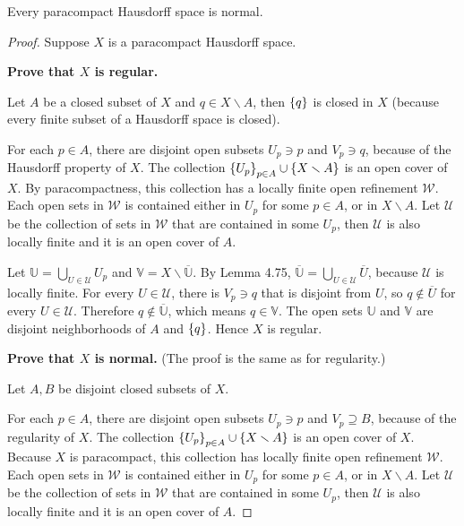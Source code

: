 \begin{theorem}{4.81}
	Every paracompact Hausdorff space is normal.
\end{theorem}

\begin{proof}
	Suppose $X$ is a paracompact Hausdorff space.

	\textbf{Prove that $X$ is regular.}

	Let $A$ be a closed subset of $X$ and $q\in X\smallsetminus A$, then $\left\{{q}\right\}$ is closed in $X$ (because every finite subset of a Hausdorff space is closed).

	For each $p\in A$, there are disjoint open subsets $U_{p}\ni p$ and $V_{p}\ni q$, because of the Hausdorff property of $X$. The collection $\left\{{U_{p}}\right\}_{p\in A} \cup \left\{{X\smallsetminus A}\right\}$ is an open cover of $X$. By paracompactness, this collection has a locally finite open refinement $\mathcal{W}$. Each open sets in $\mathcal{W}$ is contained either in $U_{p}$ for some $p\in A$, or in $X\smallsetminus A$. Let $\mathcal{U}$ be the collection of sets in $\mathcal{W}$ that are contained in some $U_{p}$, then $\mathcal{U}$ is also locally finite and it is an open cover of $A$.

	Let $\mathbb{U} = \bigcup_{U\in\mathcal{U}} U_{p}$ and $\mathbb{V} = X\smallsetminus \overline{\mathbb{U}}$. By Lemma 4.75, $\overline{\mathbb{U}} = \bigcup_{U\in \mathcal{U}} \overline{U}$, because $\mathcal{U}$ is locally finite. For every $U \in \mathcal{U}$, there is $V_{p}\ni q$ that is disjoint from $U$, so $q\notin \overline{U}$ for every $U\in \mathcal{U}$. Therefore $q\notin \overline{\mathbb{U}}$, which means $q\in \mathbb{V}$. The open sets $\mathbb{U}$ and $\mathbb{V}$ are disjoint neighborhoods of $A$ and $\left\{{q}\right\}$. Hence $X$ is regular.

	\textbf{Prove that $X$ is normal.} (The proof is the same as for regularity.)

	Let $A, B$ be disjoint closed subsets of $X$.

	For each $p\in A$, there are disjoint open subsets $U_{p}\ni p$ and $V_{p}\supseteq B$, because of the regularity of $X$. The collection $\left\{{U_{p}}\right\}_{p\in A} \cup \left\{{X\smallsetminus A}\right\}$ is an open cover of $X$. Because $X$ is paracompact, this collection has locally finite open refinement $\mathcal{W}$. Each open sets in $\mathcal{W}$ is contained either in $U_{p}$ for some $p\in A$, or in $X\smallsetminus A$. Let $\mathcal{U}$ be the collection of sets in $\mathcal{W}$ that are contained in some $U_{p}$, then $\mathcal{U}$ is also locally finite and it is an open cover of $A$.


\end{proof}

